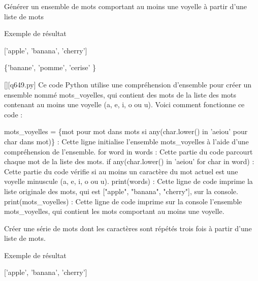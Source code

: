         \question
        Générer un ensemble de mots comportant au moins une voyelle à partir d'une liste de mots

Exemple de résultat

['apple', 'banana', 'cherry']

\{'banane', 'pomme', 'cerise' \}
        \par
        \begin{solution}
            \renewcommand{\nomfichier}{q649.py}
            \pythonfile{\chemincode \nomfichier}[][\nomfichier]
            Ce code Python utilise une compréhension d'ensemble pour créer un ensemble nommé mots\_voyelles, qui contient des mots de la liste des mots contenant au moins une voyelle (a, e, i, o ou u). Voici comment fonctionne ce code :

    mots\_voyelles = \{mot pour mot dans mots si any(char.lower() in 'aeiou' pour char dans mot)\} : Cette ligne initialise l'ensemble mots\_voyelles à l'aide d'une compréhension de l'ensemble.
        for word in words : Cette partie du code parcourt chaque mot de la liste des mots.
        if any(char.lower() in 'aeiou' for char in word) : Cette partie du code vérifie si au moins un caractère du mot actuel est une voyelle minuscule (a, e, i, o ou u).
    print(words) : Cette ligne de code imprime la liste originale des mots, qui est ["apple", "banana", "cherry"], sur la console.
    print(mots\_voyelles) : Cette ligne de code imprime sur la console l'ensemble mots\_voyelles, qui contient les mots comportant au moins une voyelle.
        \end{solution}
        

        \question
        Créer une série de mots dont les caractères sont répétés trois fois à partir d'une liste de mots.

Exemple de résultat

['apple', 'banana', 'cherry']

